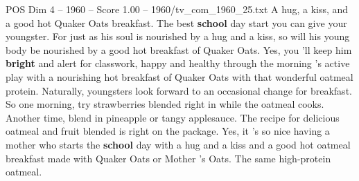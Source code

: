 \begin{textsample}{POS Dim 4 – 1960 – Score 1.00 – 1960/tv\_com\_1960\_25.txt}  \label{ex:f4_pos_013}
A hug, a kiss, and a good hot Quaker Oats breakfast.
The best \textbf{school} day start you can give your youngster.
For just as his soul is nourished by a hug and a kiss, so will his young body be nourished by a good hot breakfast of Quaker Oats.
Yes, you 'll keep him \textbf{bright} and alert for classwork, happy and healthy through the morning 's active play with a nourishing hot breakfast of Quaker Oats with that wonderful oatmeal protein.
Naturally, youngsters look forward to an occasional change for breakfast.
So one morning, try strawberries blended right in while the oatmeal cooks.
Another time, blend in pineapple or tangy applesauce.
The recipe for delicious oatmeal and fruit blended is right on the package.
Yes, it 's so nice having a mother who starts the \textbf{school} day with a hug and a kiss and a good hot oatmeal breakfast made with Quaker Oats or Mother 's Oats.
The same high-protein oatmeal.

\end{textsample}
